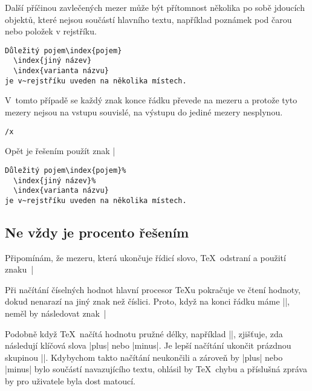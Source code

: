 \documentclass{csbulletin}
\def\p#1{\texttt{\char`\\#1}}
\begin{document}
Další příčinou zavlečených mezer může být přítomnost několika po sobě jdoucích objektů, které nejsou součástí hlavního textu, například poznámek pod čarou nebo položek v rejstříku.
\begin{Verbatim}
Důležitý pojem\index{pojem}
  \index{jiný název}
  \index{varianta názvu}
je v~rejstříku uveden na několika místech.
\end{Verbatim}
V~tomto případě se každý znak konce řádku převede na mezeru a protože tyto mezery nejsou na vstupu souvislé, na výstupu do jediné mezery nesplynou.
\begingroup
\def\x{\hbox{\rm
Důležitý pojem\index{pojem}\
  \index{jiný název}\
  \index{varianta názvu}\
je v~rejstříku uveden na několika místech.
\unskip}}%
\begin{Verbatim}[commandchars=/()]
/x
\end{Verbatim}
\endgroup
\noindent
Opět je řešením použít znak |%
\begin{Verbatim}
Důležitý pojem\index{pojem}%
  \index{jiný název}%
  \index{varianta názvu}
je v~rejstříku uveden na několika místech.
\end{Verbatim}

\subsection{Ne vždy je procento řešením}

Připomínám, že mezeru, která ukončuje řídicí slovo, \TeX\ odstraní a použití znaku~|%

Při načítání číselných hodnot hlavní procesor \TeX u pokračuje ve čtení hodnoty, dokud nenarazí na jiný znak než číslici. Proto, když na konci řádku máme ||, neměl by následovat znak~|%

Podobně když \TeX\ načítá hodnotu pružné délky, například |\parskip=2pc|, zjišťuje, zda následují klíčová slova |plus| nebo |minus|. Je lepší načítání ukončit prázdnou skupinou |{}|. Kdybychom takto načítání neukončili a zároveň by |plus| nebo |minus| bylo součástí navazujícího textu, ohlásil by \TeX\ chybu a příslušná zpráva by pro uživatele byla dost matoucí.
\end{document}
